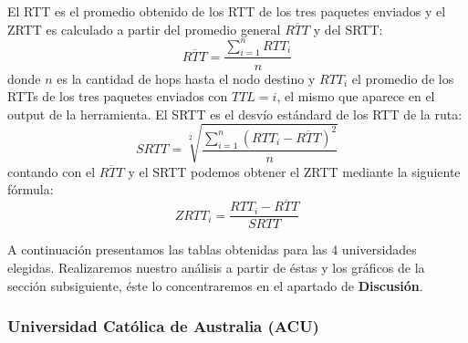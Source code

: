 El RTT es el promedio obtenido de los RTT de los tres paquetes enviados y el ZRTT es
calculado a partir del promedio general $\overline{RTT}$ y del SRTT:
\begin{displaymath}
  \overline{RTT} = \frac{\sum_{i = 1}^{n} RTT_i}{n}
\end{displaymath}
donde $n$ es la cantidad de hops hasta el nodo destino y $RTT_i$ el promedio de los
RTTs de los tres paquetes enviados con $TTL = i$, el mismo que aparece en el output
de la herramienta. El SRTT es el desvío estándard de los RTT de la ruta:
\begin{displaymath}
  SRTT = \sqrt[2]{\frac{\sum_{i = 1}^{n} (RTT_i-\overline{RTT})^2}{n}}
\end{displaymath}
contando con el $\overline{RTT}$ y el SRTT podemos obtener el ZRTT mediante la siguiente
fórmula:
\begin{displaymath}
  ZRTT_i = \frac{RTT_i - \overline{RTT}}{SRTT}
\end{displaymath}

A continuación presentamos las tablas obtenidas para las 4 universidades elegidas.
Realizaremos nuestro análisis a partir de éstas y los gráficos de la sección subsiguiente,
éste lo concentraremos en el apartado de \textbf{Discusión}.

\subsubsection{Universidad Católica de Australia (ACU)}

